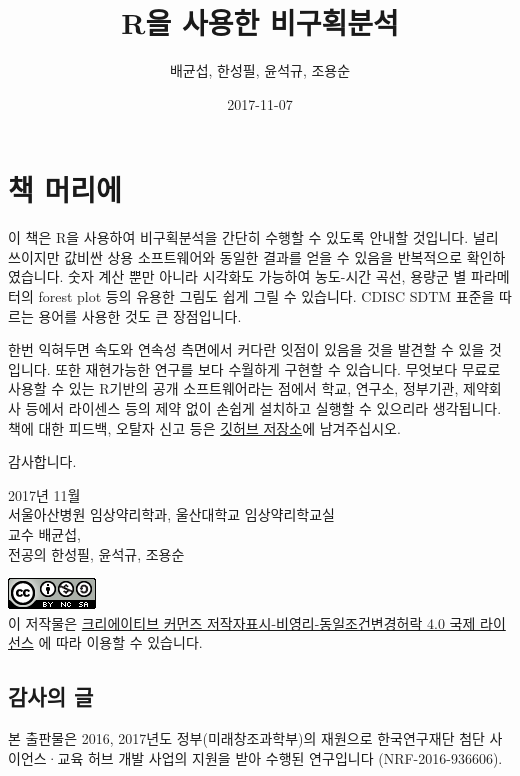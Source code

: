 \documentclass[12pt,]{krantz}
\title{R을 사용한 비구획분석}
\author{배균섭, 한성필, 윤석규, 조용순}
\date{2017-11-07}
\theoremstyle{definition}
\theoremstyle{definition}
\theoremstyle{definition}
\theoremstyle{remark}
\begin{document}
\maketitle

{
\hypersetup{linkcolor=black}
\setcounter{tocdepth}{2}
\tableofcontents
}
\chapter*{책 머리에}\label{-}


\href{https://github.com/asancpt/book-ncar}{}

이 책은 R을 사용하여 비구획분석을 간단히 수행할 수 있도록 안내할
것입니다. 널리 쓰이지만 값비싼 상용 소프트웨어와 동일한 결과를 얻을 수
있음을 반복적으로 확인하였습니다. 숫자 계산 뿐만 아니라 시각화도
가능하여 농도-시간 곡선, 용량군 별 파라메터의 forest plot 등의 유용한
그림도 쉽게 그릴 수 있습니다. CDISC SDTM 표준을 따르는 용어를 사용한
것도 큰 장점입니다.

한번 익혀두면 속도와 연속성 측면에서 커다란 잇점이 있음을 것을 발견할 수
있을 것입니다. 또한 재현가능한 연구를 보다 수월하게 구현할 수 있습니다.
무엇보다 무료로 사용할 수 있는 R기반의 공개 소프트웨어라는 점에서 학교,
연구소, 정부기관, 제약회사 등에서 라이센스 등의 제약 없이 손쉽게
설치하고 실행할 수 있으리라 생각됩니다. 책에 대한 피드백, 오탈자 신고
등은 \href{https://github.com/asancpt/book-ncar/issues}{깃허브 저장소}에
남겨주십시오.

감사합니다.

2017년 11월\\
서울아산병원 임상약리학과, 울산대학교 임상약리학교실\\
교수 배균섭,\\
전공의 한성필, 윤석규, 조용순

\includegraphics{assets/cc.png}\\
이 저작물은
\href{http://creativecommons.org/licenses/by-nc-sa/4.0/}{크리에이티브
커먼즈 저작자표시-비영리-동일조건변경허락 4.0 국제 라이선스} 에 따라
이용할 수 있습니다.

\section*{감사의 글}\label{-}


본 출판물은 2016, 2017년도 정부(미래창조과학부)의 재원으로 한국연구재단
첨단 사이언스·교육 허브 개발 사업의 지원을 받아 수행된 연구입니다
(NRF-2016-936606).
\end{document}
